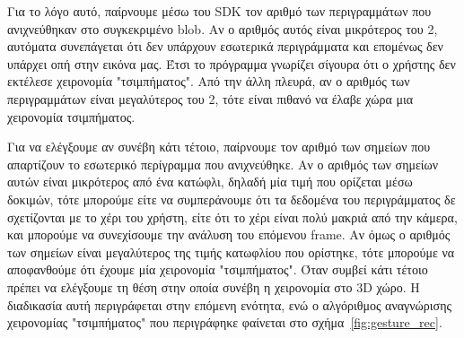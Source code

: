 Για το λόγο αυτό, παίρνουμε μέσω του SDK τον αριθμό των περιγραμμάτων που ανιχνεύθηκαν στο συγκεκριμένο blob. Αν ο αριθμός αυτός είναι μικρότερος του 2, αυτόματα συνεπάγεται ότι δεν υπάρχουν εσωτερικά περιγράμματα και επομένως δεν υπάρχει οπή στην εικόνα μας. Έτσι το πρόγραμμα γνωρίζει σίγουρα ότι ο χρήστης δεν εκτέλεσε χειρονομία "τσιμπήματος". Από την άλλη πλευρά, αν ο αριθμός των περιγραμμάτων είναι μεγαλύτερος του 2, τότε είναι πιθανό να έλαβε χώρα μια χειρονομία τσιμπήματος. 


Για να ελέγξουμε αν συνέβη κάτι τέτοιο, παίρνουμε τον αριθμό των σημείων που απαρτίζουν το εσωτερικό περίγραμμα που ανιχνεύθηκε. Αν ο αριθμός των σημείων αυτών είναι μικρότερος από ένα κατώφλι, δηλαδή μία τιμή που ορίζεται μέσω δοκιμών, τότε μπορούμε είτε να συμπεράνουμε ότι τα δεδομένα του περιγράμματος δε σχετίζονται με το χέρι του χρήστη, είτε ότι το χέρι είναι πολύ μακριά από την κάμερα, και μπορούμε να συνεχίσουμε την ανάλυση του επόμενου frame. Αν όμως ο αριθμός των σημείων είναι μεγαλύτερος της τιμής κατωφλίου που ορίστηκε, τότε μπορούμε να αποφανθούμε ότι έχουμε μία χειρονομία "τσιμπήματος". Όταν συμβεί κάτι τέτοιο πρέπει να ελέγξουμε τη θέση στην οποία συνέβη η χειρονομία στο 3D χώρο. Η διαδικασία αυτή περιγράφεται στην επόμενη ενότητα, ενώ ο αλγόριθμος αναγνώρισης χειρονομίας "τσιμπήματος" που περιγράφηκε φαίνεται στο σχήμα~\ref{fig:gesture_rec}.







